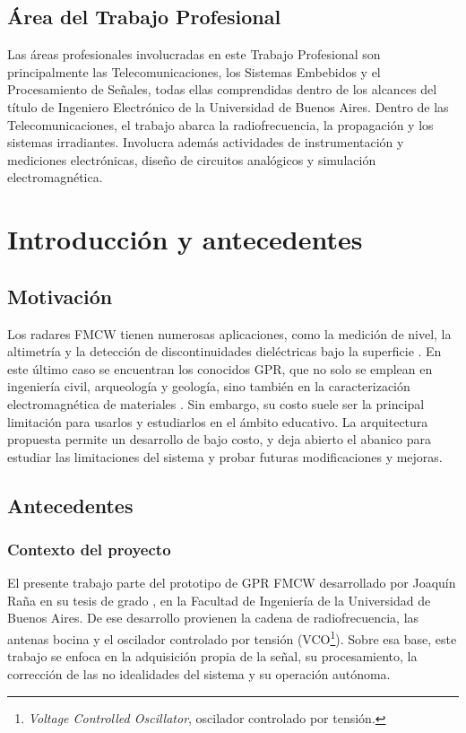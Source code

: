 \documentclass[11pt, a4paper, oneside]{article}
\newcommand{\sigla}[2]{#1\footnote{#2.}}
\begin{document}
\subsection{Área del Trabajo Profesional}

Las áreas profesionales involucradas en este Trabajo Profesional son
principalmente las Telecomunicaciones, los Sistemas Embebidos y el
Procesamiento de Señales, todas ellas comprendidas dentro de los
alcances del título de Ingeniero Electrónico de la Universidad de
Buenos Aires. Dentro de las Telecomunicaciones, el trabajo abarca la
radiofrecuencia, la propagación y los sistemas irradiantes. Involucra
además
actividades de instrumentación y mediciones electrónicas, diseño de
circuitos analógicos y simulación electromagnética.

\section{Introducción y antecedentes}

\subsection{Motivación}

Los radares FMCW tienen numerosas aplicaciones, como la medición de
nivel, la altimetría y la detección de discontinuidades dieléctricas
bajo la superficie \cite{Stove1992}. En este último caso se encuentran
los conocidos GPR, que no solo se emplean en ingeniería civil,
arqueología y geología, sino también en la caracterización
electromagnética de materiales \cite{Daniels2004}. Sin embargo, su
costo suele ser la principal limitación para usarlos y estudiarlos en
el ámbito educativo. La arquitectura propuesta permite un desarrollo de
bajo costo, y deja abierto el abanico para estudiar las limitaciones
del sistema y probar futuras modificaciones y mejoras.

\subsection{Antecedentes}

\subsubsection{Contexto del proyecto}

El presente trabajo parte del prototipo de GPR FMCW desarrollado por
Joaquín Raña en su tesis de grado \cite{Rana2026}, en la Facultad de
Ingeniería de la Universidad de Buenos Aires. De ese
desarrollo provienen la cadena de radiofrecuencia, las antenas bocina y
el oscilador controlado por tensión (\sigla{VCO}{\textit{Voltage
Controlled Oscillator}, oscilador controlado por tensión}). Sobre esa
base, este trabajo se enfoca en la adquisición propia de la señal, su
procesamiento, la corrección de las no idealidades del sistema y su
operación autónoma.
\end{document}
